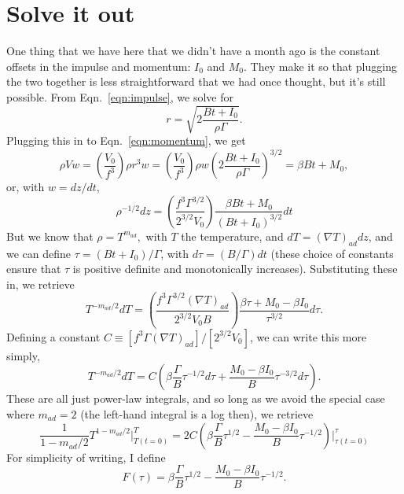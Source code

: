 \documentclass[onecolumn, amsmath, amsfonts, amssymb]{aastex62}
\newcommand{\grad}{\ensuremath{\nabla}}
\begin{document}
\section{Solve it out}
One thing that we have here that we didn't have a month ago is the constant offsets in
the impulse and momentum: $I_0$ and $M_0$.  They make it so that plugging the two together
is less straightforward that we had once thought, but it's still possible. From 
Eqn.~\ref{eqn:impulse}, we solve for
\begin{equation}
r = \sqrt{2\frac{B t + I_0}{\rho\Gamma}}.
\end{equation}
Plugging this in to Eqn.~\ref{eqn:momentum}, we get
\begin{equation}
\rho V w = \left(\frac{V_0}{f^3}\right)\rho r^3 w
= \left(\frac{V_0}{f^3}\right)\rho w \left(2\frac{B t + I_0}{\rho\Gamma}\right)^{3/2} = \beta Bt + M_0,
\end{equation}
or, with $w = dz/dt$,
\begin{equation}
\rho^{-1/2}dz = \left(\frac{f^3 \Gamma^{3/2}}{2^{3/2}V_0}\right)\frac{\beta Bt + M_0}{(Bt + I_0)^{3/2}}dt
\end{equation}
But we know that $\rho = T^{m_{ad}},$ with $T$ the temperature, and $dT = (\grad T)_{ad} dz$,
and we can define $\tau = (Bt + I_0)/\Gamma$, with $d\tau = (B/\Gamma) dt$ (these choice of constants
ensure that $\tau$ is positive definite and monotonically increases). Substituting these in, we retrieve
\begin{equation}
T^{-m_{ad}/2}dT 
= \left(\frac{f^3 \Gamma^{3/2}(\grad T)_{ad}}{2^{3/2}V_0 B}\right)\frac{\beta \tau + M_0 - \beta I_0}{\tau^{3/2}}d\tau.
\end{equation}
Defining a constant $C \equiv [f^3 \Gamma(\grad T)_{ad}]/[2^{3/2} V_0]$, we can write this more simply,
\begin{equation}
T^{-m_{ad}/2}dT = C\left(\beta \frac{\Gamma}{B}\tau^{-1/2}d\tau + \frac{M_0 - \beta I_0}{B}\tau^{-3/2}d\tau\right).
\end{equation}
These are all just power-law integrals, and so long as
we avoid the special case where $m_{ad} = 2$ (the left-hand integral is a log then), we retrieve
\begin{equation}
\frac{1}{1 - m_{ad}/2} T^{1 - m_{ad}/2}\bigg|_{T(t=0)}^{T} 
= 2C\left(\beta\frac{\Gamma}{B} \tau^{1/2} - \frac{M_0 - \beta I_0}{B}\tau^{-1/2}\right)\bigg|_{\tau(t=0)}^{\tau}
\end{equation}
For simplicity of writing, I define
$$
F(\tau) = \beta\frac{\Gamma}{B} \tau^{1/2} - \frac{M_0 - \beta I_0}{B}\tau^{-1/2}.
$$
\end{document}
